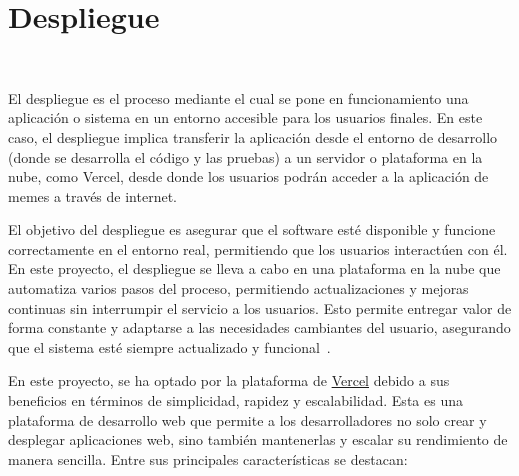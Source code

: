 \section{Despliegue}~\label{sec:despliegue}

El despliegue es el proceso mediante el cual se pone en funcionamiento una aplicación o sistema en un entorno accesible para los usuarios finales. En este caso, el despliegue implica transferir la aplicación desde el entorno de desarrollo (donde se desarrolla el código y las pruebas) a un servidor o plataforma en la nube, como Vercel, desde donde los usuarios podrán acceder a la aplicación de memes a través de internet.

El objetivo del despliegue es asegurar que el software esté disponible y funcione correctamente en el entorno real, permitiendo que los usuarios interactúen con él. En este proyecto, el despliegue se lleva a cabo en una plataforma en la nube que automatiza varios pasos del proceso, permitiendo actualizaciones y mejoras continuas sin interrumpir el servicio a los usuarios.  Esto permite entregar valor de forma constante y adaptarse a las necesidades cambiantes del usuario, asegurando que el sistema esté siempre actualizado y funcional~\cite{pressman2005software}.

En este proyecto, se ha optado por la plataforma de \href{https://vercel.com/home}{Vercel} debido a sus beneficios en términos de simplicidad, rapidez y escalabilidad. Esta es una plataforma de desarrollo web que permite a los desarrolladores no solo crear y desplegar aplicaciones web, sino también mantenerlas y escalar su rendimiento de manera sencilla. Entre sus principales características se destacan:

